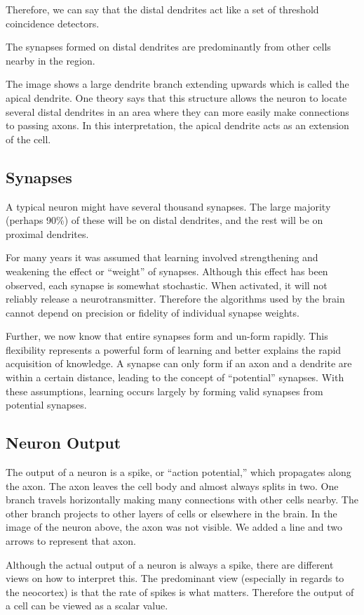 Therefore, we can say that the distal dendrites act like a set of
threshold coincidence detectors.

The synapses formed on distal dendrites are predominantly from other
cells nearby in the region.

The image shows a large dendrite branch extending upwards which is
called the apical dendrite. One theory says that this structure allows
the neuron to locate several distal dendrites in an area where they
can more easily make connections to passing axons. In this
interpretation, the apical dendrite acts as an extension of the cell.

\subsection*{Synapses}
A typical neuron might have several thousand synapses. The large
majority (perhaps 90\%) of these will be on distal dendrites, and the
rest will be on proximal dendrites.

For many years it was assumed that learning involved strengthening and
weakening the effect or ``weight'' of synapses. Although this effect
has been observed, each synapse is somewhat stochastic. When
activated, it will not reliably release a neurotransmitter. Therefore
the algorithms used by the brain cannot depend on precision or
fidelity of individual synapse weights.

Further, we now know that entire synapses form and un-form
rapidly. This flexibility represents a powerful form of learning and
better explains the rapid acquisition of knowledge. A synapse can only
form if an axon and a dendrite are within a certain distance, leading
to the concept of ``potential'' synapses. With these assumptions,
learning occurs largely by forming valid synapses from potential
synapses.

\subsection*{Neuron Output}
The output of a neuron is a spike, or ``action potential,'' which
propagates along the axon. The axon leaves the cell body and almost
always splits in two. One branch travels horizontally making many
connections with other cells nearby. The other branch projects to
other layers of cells or elsewhere in the brain. In the image of the
neuron above, the axon was not visible. We added a line and two arrows
to represent that axon.

Although the actual output of a neuron is always a spike, there are
different views on how to interpret this. The predominant view
(especially in regards to the neocortex) is that the rate of spikes is
what matters. Therefore the output of a cell can be viewed as a scalar
value.

